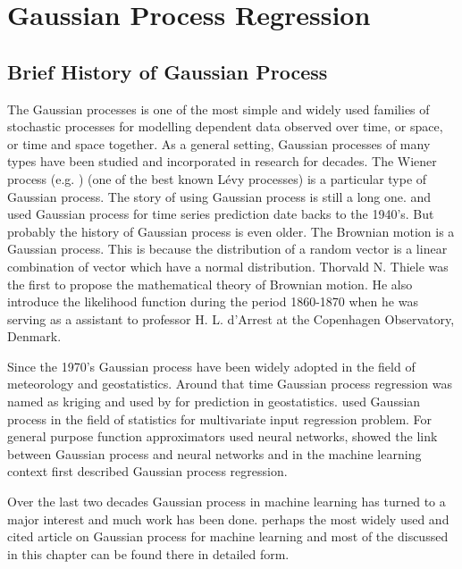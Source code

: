 \chapter{Gaussian Process Regression} \label{ch:GaussianProcessRegression}

\ifpdf
    \graphicspath{{Chapter3/Figs/Raster/}{Chapter3/Figs/PDF/}{Chapter3/Figs/}}
\else
    \graphicspath{{Chapter3/Figs/Vector/}{Chapter3/Figs/}}
\fi

\section{Brief History of Gaussian Process}
The Gaussian processes is one of the most simple and widely used families of stochastic processes for modelling dependent data observed over time, or space, or time and space together. As a general setting, Gaussian processes of many types have been studied and incorporated in research for decades.
The Wiener process (e.g. \cite{Papoulis:1991}) (one of the best known L\'{e}vy processes) is a particular type of Gaussian process. The story of using Gaussian process is still a long one. \cite{Kolmogorov:1941} and \cite{Wiener:1949} used Gaussian process for time series prediction date backs to the 1940's. But probably the history of Gaussian process is even older. The Brownian motion is a Gaussian process. This is because the distribution of a random vector is a linear combination of vector which have a normal distribution. Thorvald N. Thiele was the first to propose the mathematical theory of Brownian motion. He also introduce the likelihood function during the period 1860-1870 when he was serving as a assistant to professor H. L. d'Arrest at the Copenhagen Observatory, Denmark. 

Since the 1970's Gaussian process have been widely adopted in the field of meteorology and geostatistics. Around that time Gaussian process regression was named as kriging and used by \cite{Matheron:1973} for prediction in geostatistics. \cite{O'Hagan:1978} used Gaussian process in the field of statistics for multivariate input regression problem. For general purpose function approximators \cite{Bishop:1995} used neural networks, \cite{Neal:1996} showed the link between Gaussian process and neural networks and in the machine learning context \cite{Williams_and_Rasmussen:1996} first described Gaussian process regression. 

Over the last two decades Gaussian process in machine learning has turned to a major interest and much work has been done. \cite{Rasmussen_and_Williams:2006} perhaps the most widely used and cited article on Gaussian process for machine learning and most of the discussed in this chapter can be found there in detailed form.

